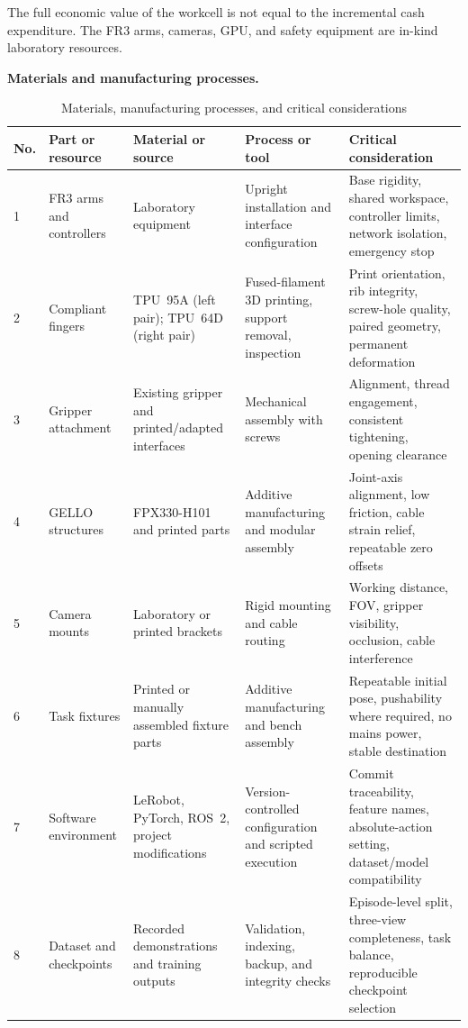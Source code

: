 The full economic value of the workcell is not equal to the incremental cash expenditure. The FR3 arms, cameras, GPU, and safety equipment are in-kind laboratory resources.

\medskip
\noindent\textbf{Materials and manufacturing processes.}

\begin{table}[htbp]
  \centering
  \caption{Materials, manufacturing processes, and critical considerations}
  \label{tab:ch4-manufacturing-processes}
  \footnotesize
  \begin{tabularx}{\textwidth}{p{}p{}p{}p{}X}
    \toprule
    \textbf{No.} & \textbf{Part or resource} & \textbf{Material or source} & \textbf{Process or tool} & \textbf{Critical consideration} \\
    \midrule
    1 & FR3 arms and controllers & Laboratory equipment & Upright installation and interface configuration & Base rigidity, shared workspace, controller limits, network isolation, emergency stop \\
    2 & Compliant fingers & TPU~95A (left pair); TPU~64D (right pair) & Fused-filament 3D printing, support removal, inspection & Print orientation, rib integrity, screw-hole quality, paired geometry, permanent deformation \\
    3 & Gripper attachment & Existing gripper and printed/adapted interfaces & Mechanical assembly with screws & Alignment, thread engagement, consistent tightening, opening clearance \\
    4 & GELLO structures & FPX330-H101 and printed parts & Additive manufacturing and modular assembly & Joint-axis alignment, low friction, cable strain relief, repeatable zero offsets \\
    5 & Camera mounts & Laboratory or printed brackets & Rigid mounting and cable routing & Working distance, FOV, gripper visibility, occlusion, cable interference \\
    6 & Task fixtures & Printed or manually assembled fixture parts & Additive manufacturing and bench assembly & Repeatable initial pose, pushability where required, no mains power, stable destination \\
    7 & Software environment & LeRobot, PyTorch, ROS~2, project modifications & Version-controlled configuration and scripted execution & Commit traceability, feature names, absolute-action setting, dataset/model compatibility \\
    8 & Dataset and checkpoints & Recorded demonstrations and training outputs & Validation, indexing, backup, and integrity checks & Episode-level split, three-view completeness, task balance, reproducible checkpoint selection \\
    \bottomrule
  \end{tabularx}
\end{table}

